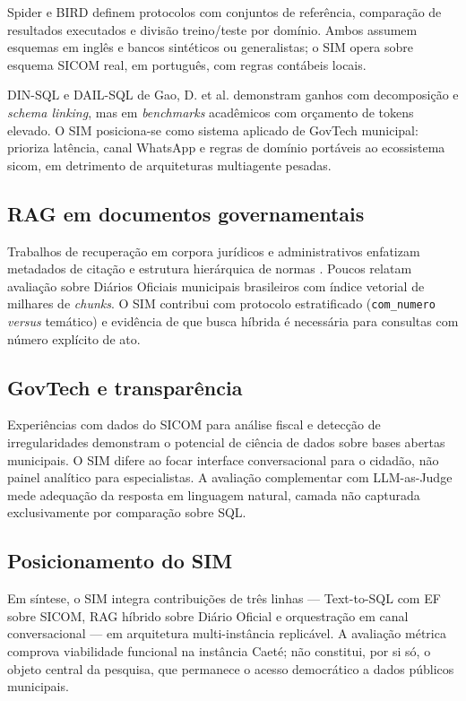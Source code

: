Spider \cite{Yu2018Spider} e BIRD \cite{Li2024BIRD} definem protocolos com conjuntos de referência, comparação de resultados executados e divisão treino/teste por domínio. Ambos assumem esquemas em inglês e bancos sintéticos ou generalistas; o SIM opera sobre esquema SICOM real, em português, com regras contábeis locais.

DIN-SQL \cite{Pourreza2024DIN} e DAIL-SQL de Gao, D. et al. \cite{Gao2024DAILSQL} demonstram ganhos com decomposição e \textit{schema linking}, mas em \textit{benchmarks} acadêmicos com orçamento de tokens elevado. O SIM posiciona-se como sistema aplicado de GovTech municipal: prioriza latência, canal WhatsApp e regras de domínio portáveis ao ecossistema \gls{sicom}, em detrimento de arquiteturas multiagente pesadas.

\subsection{RAG em documentos governamentais}

Trabalhos de recuperação em corpora jurídicos e administrativos enfatizam metadados de citação e estrutura hierárquica de normas \cite{Gao2024RAGSurvey}. Poucos relatam avaliação sobre Diários Oficiais municipais brasileiros com índice vetorial de milhares de \textit{chunks}. O SIM contribui com protocolo estratificado (\texttt{com\_numero} \textit{versus} temático) e evidência de que busca híbrida é necessária para consultas com número explícito de ato.

\subsection{GovTech e transparência}

Experiências com dados do SICOM para análise fiscal e detecção de irregularidades \cite{Lei2024SICOM} demonstram o potencial de ciência de dados sobre bases abertas municipais. O SIM difere ao focar interface conversacional para o cidadão, não painel analítico para especialistas. A avaliação complementar com LLM-as-Judge \cite{Zheng2023LLMJudge} mede adequação da resposta em linguagem natural, camada não capturada exclusivamente por comparação sobre SQL.

\subsection{Posicionamento do SIM}

Em síntese, o SIM integra contribuições de três linhas --- Text-to-SQL com EF sobre SICOM, RAG híbrido sobre Diário Oficial e orquestração em canal conversacional --- em arquitetura multi-instância replicável. A avaliação métrica comprova viabilidade funcional na instância Caeté; não constitui, por si só, o objeto central da pesquisa, que permanece o acesso democrático a dados públicos municipais.
